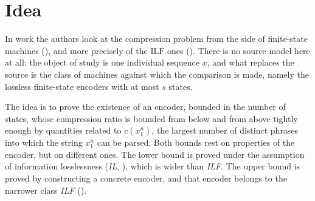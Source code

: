 \section{Idea}

In \cite{ziv1978} work the authors look at the compression problem from the side of finite-state machines (), and more precisely of the \(\mathrm{ILF}\) ones (). There is no source model here at all: the object of study is one individual sequence \(x\), and what replaces the source is the class of machines against which the comparison is made, namely the lossless finite-state encoders with at most \(s\) states. 

The idea is to prove the existence of an encoder, bounded in the number of states, whose compression ratio is bounded from below and from above tightly enough by quantities related to \(c(x_1^n)\), the largest number of distinct phrases into which the string \(x_1^n\) can be parsed. Both bounds rest on properties of the encoder, but on different ones. The lower bound is proved under the assumption of information losslessness (\emph{IL}, ), which is wider than \emph{ILF}. The upper bound is proved by constructing a concrete encoder, and that encoder belongs to the narrower class \emph{ILF} ().





